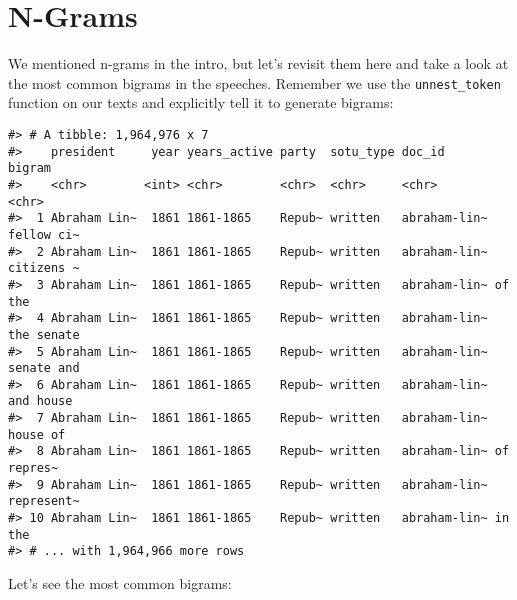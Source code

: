 \documentclass[]{book}
\newenvironment{Shaded}{\begin{snugshade}}{\end{snugshade}}
\newcommand{\CommentTok}[1]{\textcolor[rgb]{0.56,0.35,0.01}{\textit{#1}}}
\newcommand{\DataTypeTok}[1]{\textcolor[rgb]{0.13,0.29,0.53}{#1}}
\newcommand{\DecValTok}[1]{\textcolor[rgb]{0.00,0.00,0.81}{#1}}
\newcommand{\KeywordTok}[1]{\textcolor[rgb]{0.13,0.29,0.53}{\textbf{#1}}}
\newcommand{\NormalTok}[1]{#1}
\newcommand{\OperatorTok}[1]{\textcolor[rgb]{0.81,0.36,0.00}{\textbf{#1}}}
\newcommand{\OtherTok}[1]{\textcolor[rgb]{0.56,0.35,0.01}{#1}}
\newcommand{\StringTok}[1]{\textcolor[rgb]{0.31,0.60,0.02}{#1}}
\begin{document}
\hypertarget{n-grams}{%
\section{N-Grams}\label{n-grams}}

We mentioned n-grams in the intro, but let's revisit them here and take a look at the most common bigrams in the speeches. Remember we use the \texttt{unnest\_token} function on our texts and explicitly tell it to generate bigrams:

\begin{Shaded}
\end{Shaded}

\begin{verbatim}
#> # A tibble: 1,964,976 x 7
#>    president     year years_active party  sotu_type doc_id       bigram    
#>    <chr>        <int> <chr>        <chr>  <chr>     <chr>        <chr>     
#>  1 Abraham Lin~  1861 1861-1865    Repub~ written   abraham-lin~ fellow ci~
#>  2 Abraham Lin~  1861 1861-1865    Repub~ written   abraham-lin~ citizens ~
#>  3 Abraham Lin~  1861 1861-1865    Repub~ written   abraham-lin~ of the    
#>  4 Abraham Lin~  1861 1861-1865    Repub~ written   abraham-lin~ the senate
#>  5 Abraham Lin~  1861 1861-1865    Repub~ written   abraham-lin~ senate and
#>  6 Abraham Lin~  1861 1861-1865    Repub~ written   abraham-lin~ and house 
#>  7 Abraham Lin~  1861 1861-1865    Repub~ written   abraham-lin~ house of  
#>  8 Abraham Lin~  1861 1861-1865    Repub~ written   abraham-lin~ of repres~
#>  9 Abraham Lin~  1861 1861-1865    Repub~ written   abraham-lin~ represent~
#> 10 Abraham Lin~  1861 1861-1865    Repub~ written   abraham-lin~ in the    
#> # ... with 1,964,966 more rows
\end{verbatim}

Let's see the most common bigrams:

\begin{Shaded}
\end{Shaded}
\end{document}
